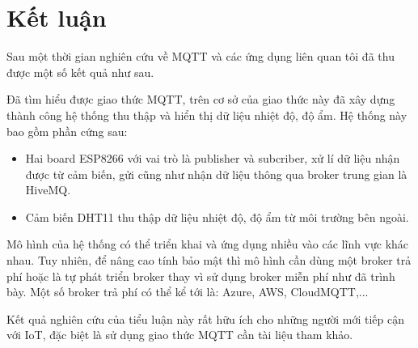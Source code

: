 \chapter*{Kết luận} %

\label{Chapter_end}

Sau một thời gian nghiên cứu về MQTT và các ứng dụng liên quan tôi đã thu được một số kết quả như sau.

Đã tìm hiểu được giao thức MQTT, trên cơ sở của giao thức này đã xây dựng thành công hệ thống thu thập và hiển thị dữ liệu nhiệt độ, độ ẩm. Hệ thống này bao gồm phần cứng sau:
\begin{itemize}
	\item Hai board ESP8266 với vai trò là publisher và subcriber, xử lí dữ liệu nhận được từ cảm biến, gửi cũng như nhận dữ liệu thông qua broker trung gian là HiveMQ.
	\item Cảm biến DHT11 thu thập dữ liệu nhiệt độ, độ ẩm từ môi trường bên ngoài.
\end{itemize}

Mô hình của hệ thống có thể triển khai và ứng dụng nhiều vào các lĩnh vực khác nhau.  Tuy nhiên, để nâng cao tính bảo mật thì mô hình cần dùng một broker trả phí hoặc là tự phát triển broker thay vì sử dụng broker miễn phí như đã trình bày. Một số broker trả phí có thể kể tới là: Azure, AWS, CloudMQTT,...

Kết quả nghiên cứu của tiểu luận này rất hữu ích cho những người mới tiếp cận với IoT, đặc biệt là sử dụng giao thức MQTT cần tài liệu tham khảo.